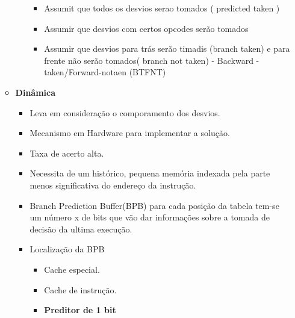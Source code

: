 \documentclass[a4paper]{article}
\begin{document}
\begin{enumerate}
\begin{itemize}
\begin{itemize}
\begin{itemize}
                                \item Assumit que todos os desvios serao tomados ( predicted taken )
                                \item Assumir que desvios com certos opcodes serão tomados
                                \item Assumir que desvios para trás serão timadis (branch taken) e para frente não serão
                                    tomados( branch not taken) - Backward - taken/Forward-notaen (BTFNT)
                            \end{itemize}
                    \end{itemize}
                \item \textbf{Dinâmica}
                    \begin{itemize}
                        \item Leva em consideração o comporamento dos desvios.
                        \item Mecanismo em Hardware para implementar a solução.
                        \item Taxa de acerto alta.
                        \item Necessita de um histórico, pequena memória indexada pela parte menos significativa do
                            endereço da instrução.
                        \item Branch Prediction Buffer(BPB) para cada posição da tabela tem-se um número x de bits que
                            vão dar informações sobre a tomada de decisão da ultima execução.
                        \item Localização da BPB
                            \begin{itemize}
                                \item Cache especial.
                                \item Cache de instrução.
                            \end{itemize}
                            \begin{itemize}
                                \item  \textbf{Preditor de 1 bit}
                                    \begin{itemize}
                                        \begin{figure}

\end{figure}
\end{itemize}
\end{itemize}
\end{itemize}
\end{itemize}
\end{enumerate}
\end{document}
